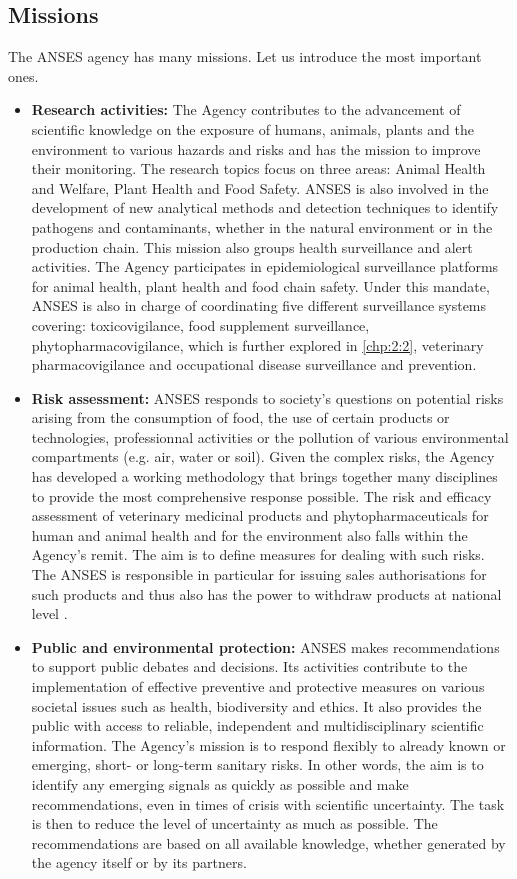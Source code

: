 \subsection{Missions} 

The ANSES agency has many missions. Let us introduce the most important ones.
\begin{itemize}
\item \textbf{Research activities:} The Agency contributes to the advancement of scientific knowledge on the exposure of humans, animals, plants and the environment to various hazards and risks and has the mission to improve their monitoring. The research topics focus on three areas: Animal Health and Welfare, Plant Health and Food Safety. ANSES is also involved in the development of new analytical methods and detection techniques to identify pathogens and contaminants, whether in the natural environment or in the production chain. This mission also groups health surveillance and alert activities. The Agency participates in epidemiological surveillance platforms for animal health, plant health and food chain safety. Under this mandate, ANSES is also in charge of coordinating five different surveillance systems covering: toxicovigilance, food supplement surveillance, phytopharmacovigilance, which is further explored in \ref{chp:2:2}, veterinary pharmacovigilance and occupational disease surveillance and prevention. 
\item \textbf{Risk assessment:} ANSES responds to society's questions on potential risks arising from the consumption of food, the use of certain products or technologies, professionnal activities or the pollution of various environmental compartments (e.g. air, water or soil). Given the complex risks, the Agency has developed a working methodology that brings together many disciplines to provide the most comprehensive response possible. The risk and efficacy assessment of veterinary medicinal products and phytopharmaceuticals for human and animal health and for the environment also falls within the Agency's remit. The aim is to define measures for dealing with such risks. The ANSES is responsible in particular for issuing sales authorisations for such products and thus also has the power to withdraw products at national level \citep{ansesdec}. 
\item \textbf{Public and environmental protection:} ANSES makes recommendations to support public debates and decisions. Its activities contribute to the implementation of effective preventive and protective measures on various societal issues such as health, biodiversity and ethics. It also provides the public with access to reliable, independent and multidisciplinary scientific information. The Agency's mission is to respond flexibly to already known or emerging, short- or long-term sanitary risks. In other words, the aim is to identify any emerging signals as quickly as possible and make recommendations, even in times of crisis with scientific uncertainty. The task is then to reduce the level of uncertainty as much as possible. The recommendations are based on all available knowledge, whether generated by the agency itself or by its partners. 
\end{itemize}

